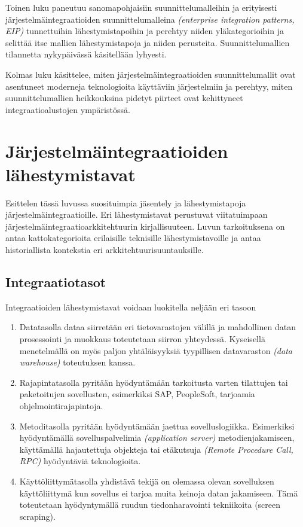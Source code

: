 Toinen luku paneutuu sanomapohjaisiin suunnittelumalleihin ja erityisesti järjestelmäintegraatioiden suunnittelumalleina \textit{(enterprise integration patterns, EIP)} tunnettuihin lähestymistapoihin ja perehtyy niiden yläkategorioihin ja selittää itse mallien lähestymistapoja ja niiden perusteita. Suunnittelumallien tilannetta nykypäivässä käsitellään lyhyesti.

Kolmas luku käsittelee, miten järjestelmäintegraatioiden suunnittelumallit ovat asentuneet moderneja teknologioita käyttäviin järjestelmiin ja perehtyy, miten suunnittelumallien heikkouksina pidetyt piirteet ovat kehittyneet integraatioalustojen ympäristössä.


\chapter{Järjestelmäintegraatioiden lähestymistavat} \label{chap:lähestymis_tavat}

Esittelen tässä luvussa suosituimpia jäsentely ja lähestymistapoja järjestelmäintegraatioille. Eri lähestymistavat perustuvat viitatuimpaan järjestelmäintegraatioarkkitehtuurin kirjallisuuteen. Luvun tarkoituksena on antaa kattokategorioita erilaisille teknisille lähestymistavoille ja antaa historiallista kontekstia eri arkkitehtuurisuuntauksille.

\section{Integraatiotasot}

Integraatioiden lähestymistavat voidaan luokitella neljään eri tasoon \citep[sivu 21-23]{linthicum2000enterprise}

\begin{enumerate}
   \item Datatasolla dataa siirretään eri tietovarastojen välillä ja mahdollinen datan prosessointi ja muokkaus toteutetaan siirron yhteydessä. Kyseisellä menetelmällä on myös paljon yhtäläisyyksiä tyypillisen datavaraston \textit{(data warehouse)} toteutuksen kanssa.
   \item Rajapintatasolla pyritään hyödyntämään tarkoitusta varten tilattujen tai paketoitujen sovellusten, esimerkiksi SAP, PeopleSoft, tarjoamia ohjelmointirajapintoja.
   \item Metoditasolla pyritään hyödyntämään jaettua sovelluslogiikka. Esimerkiksi hyödyntämällä sovelluspalvelimia \textit{(application server)} metodienjakamiseen,  käyttämällä hajautettuja objekteja tai etäkutsuja \textit{(Remote Procedure Call, RPC)} hyödyntäviä teknologioita.
   \item Käyttöliittymätasolla yhdistävä tekijä on olemassa olevan sovelluksen käyttöliittymä kun sovellus ei tarjoa muita keinoja datan jakamiseen. Tämä toteutetaan hyödyntymällä ruudun tiedonharavointi tekniikoita (screen scraping).
   
\end{enumerate}

